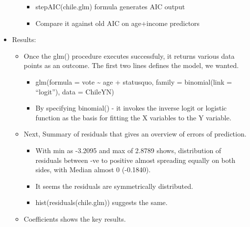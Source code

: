 \documentclass[]{article}
\providecommand{\tightlist}{%
  \setlength{\itemsep}{0pt}\setlength{\parskip}{0pt}}
\begin{document}
\begin{itemize}
\begin{itemize}
    \begin{itemize}
    \tightlist
    \item
      stepAIC(chile.glm) formula generates AIC output
    \item
      Compare it against old AIC on age+income predictors
    \end{itemize}
  \end{itemize}
\item
  Results:

  \begin{itemize}
  \tightlist
  \item
    Once the glm() procedure executes successfuly, it returns various
    data points as an outcome. The first two lines defines the model, we
    wanted.

    \begin{itemize}
    \tightlist
    \item
      glm(formula = vote \textasciitilde{} age + statusquo, family =
      binomial(link = ``logit''), data = ChileYN)
    \item
      By specifying binomial() - it invokes the inverse logit or
      logistic function as the basis for fitting the X variables to the
      Y variable.
    \end{itemize}
  \item
    Next, Summary of residuals that gives an overview of errors of
    prediction.

    \begin{itemize}
    \tightlist
    \item
      With min as -3.2095 and max of 2.8789 shows, distribution of
      residuals between -ve to positive almost spreading equally on both
      sides, with Median almost 0 (-0.1840).
    \item
      It seems the residuals are symmetrically distributed.
    \item
      hist(residuals(chile.glm)) suggests the same.
    \end{itemize}
  \item
    Coefficients shows the key results.


\end{itemize}
\end{itemize}
\end{document}

